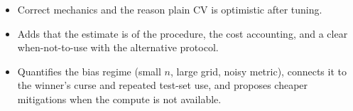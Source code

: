\begin{interviewq}

\goodgreat
\begin{itemize}
    \item {} Correct mechanics and the reason plain CV is optimistic after tuning.
    \item {} Adds that the estimate is of the procedure, the cost accounting, and a clear when-not-to-use with the alternative protocol.
    \item {} Quantifies the bias regime (small $n$, large grid, noisy metric), connects it to the winner's curse and repeated test-set use, and proposes cheaper mitigations when the compute is not available.
\end{itemize}

\end{interviewq}

